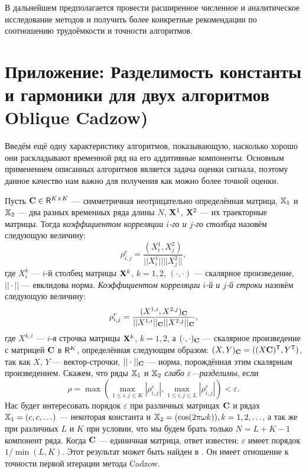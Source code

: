 \documentclass[12pt,a4paper,fleqn,leqno]{article}
\begin{document}
В дальнейшем предполагается провести расширенное численное и аналитическое исследование методов и получить более конкретные рекомендации по
соотношению трудоёмкости и точности алгоритмов.




\section{Приложение: Разделимость константы и гармоники для двух алгоритмов Oblique Cadzow)}
\label{sec:app}

Введём ещё одну характеристику алгоритмов, показывающую, насколько хорошо они раскладывают временной ряд на его аддитивные компоненты. Основным применением описанных алгоритмов является задача оценки сигнала, поэтому данное качество нам важно для получения как можно более точной оценки.

Пусть $\mathbf{C} \in \mathsf{R}^{K \times K}$ --- симметричная неотрицательно определённая матрица, $\mathbb{X}_1$ и $\mathbb{X}_2$ ---  два разных временных ряда длины $N$, $\mathbf{X}^1$, $\mathbf{X}^2$ --- их траекторные матрицы. Тогда \emph{коэффициентом корреляции $i$-го и $j$-го столбца} назовём следующую величину:
\begin{equation}\label{col_corr}
\rho^c_{i,j} = \frac{(X^1_i, X^2_j)}{||X^1_i|| ||X^2_j||},
\end{equation}
где $X^k_i$ --- $i$-й столбец матрицы $\mathbf{X}^k$, $k = 1, 2$, $(\cdot, \cdot)$ --- скалярное произведение, $||\cdot||$ --- евклидова норма. \emph{Коэффициентом корреляции $i$-й и $j$-й строки} назовём следующую величину:
\begin{equation}\label{row_corr}
\rho^r_{i,j} = \frac{(X^{1,i}, X^{2,j})_{\mathbf{C}}}{||X^{1,i}||_{\mathbf{C}} ||X^{2,j}||_{\mathbf{C}}},
\end{equation}
где $X^{k,i}$ --- $i$-я строчка матрицы $\mathbf{X}^k$, $k = 1, 2$, а $(\cdot, \cdot)_{\mathbf{C}}$ --- скалярное произведение с матрицей $\mathbf{C}$ в $\mathsf{R}^K$, определённая следующим образом: $(X, Y)_{\mathbf{C}} = ((X\mathbf{C})^{\mathsf{T}}, Y^{\mathsf{T}})$, так как $X$, $Y$ --- вектор-строчки, $|| \cdot ||_{\mathbf{C}}$ --- норма, порождённая этим скалярным произведением. Скажем, что ряды $\mathbb{X}_1$ и $\mathbb{X}_2$ \emph{слабо $\varepsilon$---разделимы}, если
\begin{equation}\label{weak_sep_eq}
\rho = \max(\max_{1 \le i,j \le K}|\rho^c_{i,j}|, \max_{1 \le i,j \le L}|\rho^r_{i,j}|) < \varepsilon.
\end{equation}
Нас будет интересовать порядок $\varepsilon$ при различных матрицах $\mathbf{C}$ и рядах $\mathbb{X}_1 = (c, c, \ldots)$ --- некоторая константа и $\mathbb{X}_2 = (\cos(2 \pi \omega k)), k = 1, 2, \ldots$, а так же при различных $L$ и $K$ при условии, что мы будем брать только $N = L + K - 1$ компонент ряда. Когда $\mathbf{C}$ --- единичная матрица, ответ известен: $\varepsilon$ имеет порядок $1/\min(L,K)$. Этот результат может быть найден в \cite[Раздел 6.1]{Golyandina.etal2001}. Он имеет отношение к точности первой итерации метода Cadzow.
\end{document}
